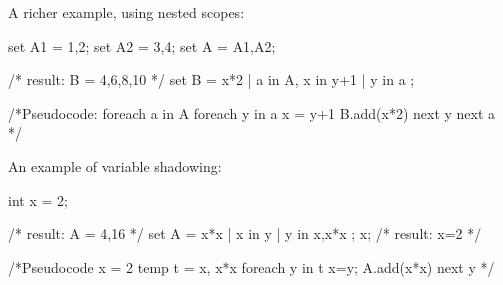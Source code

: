 A richer example, using nested scopes:

\begin{code}
set A1 = {1,2};
set A2 = {3,4};
set A = {A1,A2};

/* result: B = {4,6,8,10} */
set B = {x*2 | a in A, x in {y+1 | y in a } };  

	  /*Pseudocode: 
        foreach a in A
            foreach y in a
                x = y+1                
                B.add(x*2)
            next y
        next a
	   */		 
\end{code}

An example of variable shadowing:

\begin{code}
int x = 2;

/* result: A = {4,16} */
set A = {x*x | x in {y | y in {x,x*x} } }; 
x; /* result: x=2 */
      
      /*Pseudocode
        x = 2 
        temp t = {x, x*x}
        foreach y in t
            x=y;
            A.add(x*x)        
        next y      
       */
\end{code}
